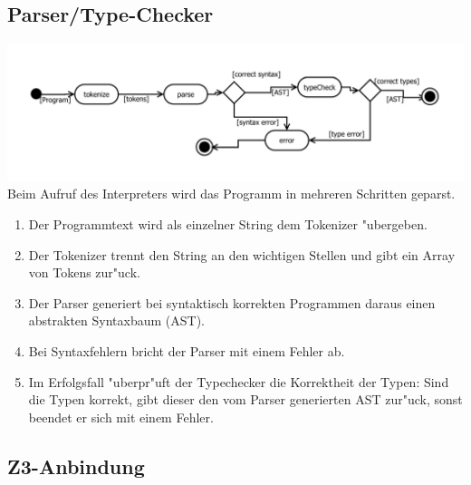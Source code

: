 \documentclass[10pt,a4paper,titlepage]{article}
\begin{document}
\subsection{Parser/Type-Checker}

\includegraphics[scale=0.8]{images/AktivitaetParser.pdf}\newline
Beim Aufruf des Interpreters wird das Programm in mehreren Schritten geparst.
\begin{enumerate}
\item Der Programmtext wird als einzelner String dem Tokenizer "ubergeben.
\item Der Tokenizer trennt den String an den wichtigen Stellen und gibt ein Array von Tokens zur"uck.
\item Der Parser generiert bei syntaktisch korrekten Programmen daraus einen abstrakten Syntaxbaum (AST).
\item Bei Syntaxfehlern bricht der Parser mit einem Fehler ab.
\item Im Erfolgsfall "uberpr"uft der Typechecker die Korrektheit der Typen: Sind die Typen korrekt, gibt dieser den vom Parser generierten AST zur"uck, sonst beendet er sich mit einem Fehler.
\end{enumerate}

\subsection{Z3-Anbindung}
\end{document}
